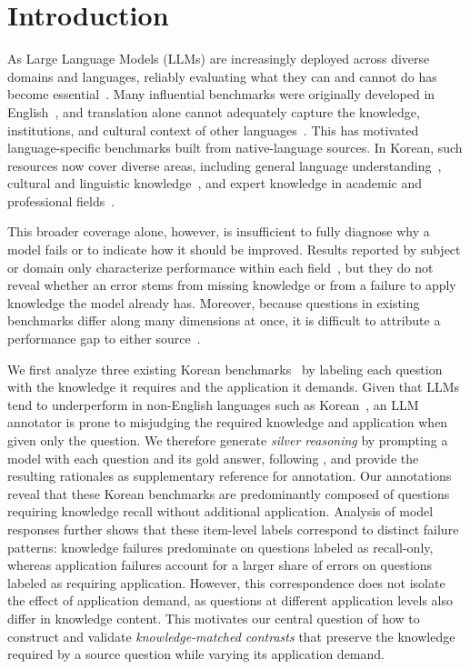 \section{Introduction}

As Large Language Models (LLMs) are increasingly deployed across diverse domains and languages, reliably evaluating what they can and cannot do has become essential~\citep{chang2024survey, liang2023holistic}.
Many influential benchmarks were originally developed in English~\citep{hendrycks2020measuring}, and translation alone cannot adequately capture the knowledge, institutions, and cultural context of other languages~\citep{son2025kmmlu}.
This has motivated language-specific benchmarks built from native-language sources.
In Korean, such resources now cover diverse areas, including general language understanding~\citep{park2021klue}, cultural and linguistic knowledge~\citep{kim2024click}, and expert knowledge in academic and professional fields~\citep{son2025kmmlu, hong-etal-2025-kmmlu}.

This broader coverage alone, however, is insufficient to fully diagnose why a model fails or to indicate how it should be improved.
Results reported by subject or domain only characterize performance within each field~\citep{ribeiro2020beyond, burnell2023rethink}, but they do not reveal whether an error stems from missing knowledge or from a failure to apply knowledge the model already has. 
Moreover, because questions in existing benchmarks differ along many dimensions at once, it is difficult to attribute a performance gap to either source~\citep{gardner2020evaluating, wu2024reasoning}.

We first analyze three existing Korean benchmarks~\citep{kim2024click, hong-etal-2025-kmmlu} by labeling each question with the knowledge it requires and the application it demands.
Given that LLMs tend to underperform in non-English languages such as Korean~\citep{ahuja2023mega}, an LLM annotator is prone to misjudging the required knowledge and application when given only the question.
We therefore generate \textit{silver reasoning} by prompting a model with each question and its gold answer, following \citet{zelikman2022star}, and provide the resulting rationales as supplementary reference for annotation.
Our annotations reveal that these Korean benchmarks are predominantly composed of questions requiring knowledge recall without additional application.
Analysis of model responses further shows that these item-level labels correspond to distinct failure patterns: knowledge failures predominate on questions labeled as recall-only, whereas application failures account for a larger share of errors on questions labeled as requiring application.
However, this correspondence does not isolate the effect of application demand, as questions at different application levels also differ in knowledge content.
This motivates our central question of how to construct and validate \textit{knowledge-matched contrasts} that preserve the knowledge required by a source question while varying its application demand.

